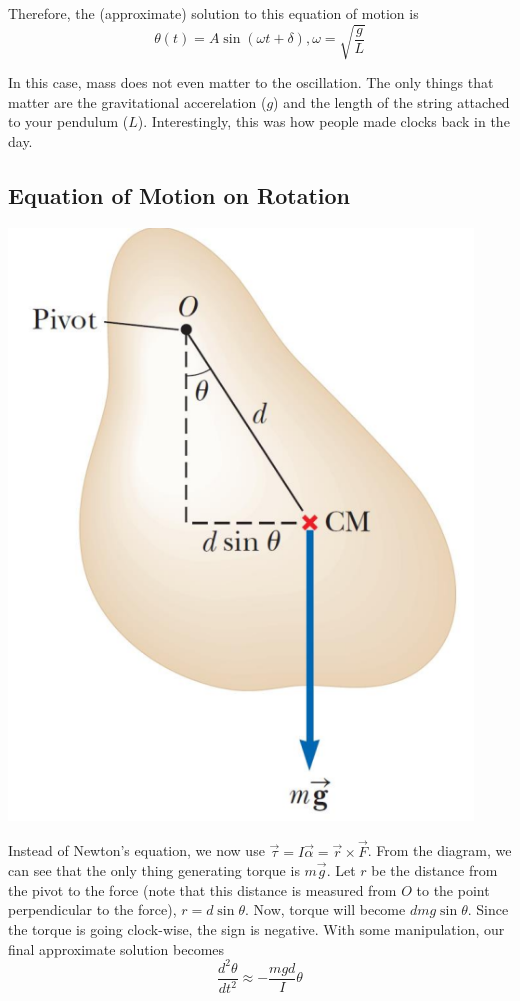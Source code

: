 Therefore, the (approximate) solution to this equation of motion is
\[ \theta(t) = A\sin(\omega t + \delta), \omega = \sqrt{\frac{g}{L}} \]

In this case, mass does not even matter to the oscillation. The only things that matter are the 
gravitational accerelation ($g$) and the length of the string attached to your pendulum ($L$).
Interestingly, this was how people made clocks back in the day.

\subsection{Equation of Motion on Rotation}

\begin{center}
\includegraphics[scale=0.5]{images/oaw/rotation01.png}
\end{center}

Instead of Newton's equation, we now use $\vec{\tau} = I\vec{\alpha} = \vec{r}\times\vec{F}$.
From the diagram, we can see that the only thing generating torque is $m\vec{g}$. Let $r$ be the
distance from the pivot to the force (note that this distance is measured from $O$ to the point
perpendicular to the force), $r = d\sin\theta$. Now, torque will become $dmg\sin\theta$. Since
the torque is going clock-wise, the sign is negative. With some manipulation, our final 
approximate solution becomes
\[ \frac{d^2\theta}{dt^2} \approx -\frac{mgd}{I}\theta \]

